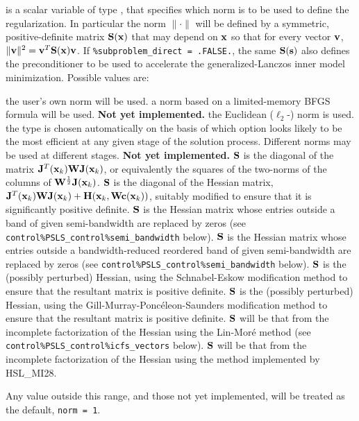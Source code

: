 \documentclass{galahad}
\begin{document}
\begin{description}
 is a scalar variable of type \integer,
that specifies which norm is to be used to define the regularization.
In particular the norm $\|\cdot\|$ will be defined by a symmetric,
positive-definite matrix ${\mathbf{S}}({\mathbf{x}})$ that may depend on ${\mathbf{x}}$
so that for every vector ${\mathbf{v}}$, $\|{\mathbf{v}}\|^2 = {\mathbf{v}}^T {\mathbf{S}}({\mathbf{x}}) {\mathbf{v}}$.
If {\tt \%subproblem\_direct = .FALSE.}, the same ${\mathbf{S}}({\mathbf{s}})$ also defines the
preconditioner to be used to accelerate the generalized-Lanczos
inner model minimization.  Possible values are:


\begin{description}
 the user's own norm will be used.
 a norm based on a limited-memory BFGS formula will be used.
        {\bf Not yet implemented.}
 the Euclidean ($\ell_2$-) norm is used.
 the type is chosen automatically on the basis of which option looks
        likely to be the most efficient at any given stage of the solution
        process. Different norms may be used at different stages.
        {\bf Not yet implemented.}
 ${\mathbf{S}}$ is the diagonal of the matrix ${\mathbf{J}}^T({\mathbf{x}}_k) {\mathbf{W}} {\mathbf{J}}({\mathbf{x}}_k)$,
        or equivalently the squares of the two-norms of the columns of
        ${\mathbf{W}}^{{\scriptstyle \frac{1}{2}}} {\mathbf{J}}({\mathbf{x}}_k)$.
 ${\mathbf{S}}$ is the diagonal of the Hessian matrix,
        ${\mathbf{J}}^T({\mathbf{x}}_k) {\mathbf{W}} {\mathbf{J}}({\mathbf{x}}_k) + {\mathbf{H}}({\mathbf{x}}_k,{\mathbf{W}}{\mathbf{c}}({\mathbf{x}}_k))$,
        suitably modified to ensure that it is significantly positive definite.
 ${\mathbf{S}}$ is the Hessian matrix whose entries outside a band of
         given semi-bandwidth are replaced by zeros
        (see {\tt control\%PSLS\_control\%semi\_bandwidth} below).
 ${\mathbf{S}}$ is the Hessian matrix whose entries outside a
        bandwidth-reduced reordered band of given semi-bandwidth are
        replaced by zeros
        (see {\tt control\%PSLS\_control\%semi\_bandwidth} below).
 ${\mathbf{S}}$ is the (possibly perturbed) Hessian,
         using the Schnabel-Eskow modification
        method to ensure that the resultant matrix is positive definite.
 ${\mathbf{S}}$ is the (possibly perturbed) Hessian,
        using the Gill-Murray-Ponc\'{e}leon-Saunders
        modification method to ensure that the resultant matrix is
        positive definite.
 ${\mathbf{S}}$ will be that from the incomplete factorization of the Hessian
        using the Lin-Mor\'{e} method
        (see {\tt control\%PSLS\-\_control\%icfs\_vectors} below).
 ${\mathbf{S}}$ will be that from the incomplete factorization of the Hessian
        using the method implemented by HSL\_MI28.
\end{description}
Any value outside this range, and those not yet implemented, will be
treated as the default, {\tt norm = 1}.


\end{description}
\end{document}
